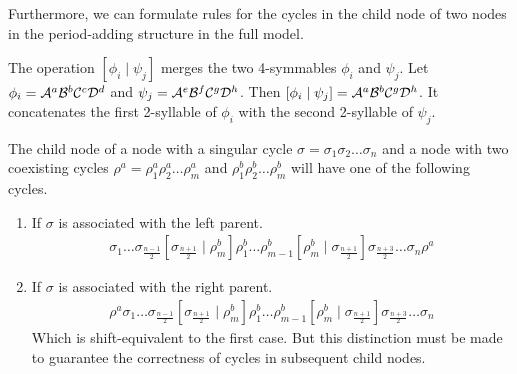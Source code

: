 Furthermore, we can formulate rules for the cycles in the child node of two nodes in the period-adding structure in the full model.

\begin{definition}
    The operation $\left[\phi_i \mid \psi_j\right]$ merges the two 4-symmables $\phi_i$ and $\psi_j$.
    Let $\phi_i = \mathcal{A}^a\mathcal{B}^b\mathcal{C}^c\mathcal{D}^d$ and $\psi_j = \mathcal{A}^e\mathcal{B}^f\mathcal{C}^g\mathcal{D}^h$.
    Then $\left[\phi_i \mid \psi_j\right] = \mathcal{A}^a\mathcal{B}^b\mathcal{C}^g\mathcal{D}^h$.
    It concatenates the first 2-syllable of $\phi_i$ with the second 2-syllable of $\psi_j$.
\end{definition}

\begin{theorem}
    The child node of a node with a singular cycle $\sigma = \sigma_1\sigma_2 \dots \sigma_n$ and a node with two coexisting cycles $\rho^a = \rho^a_1\rho^a_2 \dots \rho^a_m$ and $\rho^b_1\rho^b_2 \dots \rho^b_m$ will have one of the following cycles.
    \begin{enumerate}
        \item If $\sigma$ is associated with the left parent.
              \begin{align*}
                  \sigma_1 \dots \sigma_{\frac{n-1}{2}} \left[\sigma_{\frac{n+1}{2}} \mid \rho^b_m\right]
                  \rho^b_1 \dots \rho^b_{m-1} \left[\rho^b_m \mid \sigma_{\frac{n+1}{2}}\right]
                  \sigma_{\frac{n+3}{2}} \dots \sigma_n \rho^a
              \end{align*}
        \item If $\sigma$ is associated with the right parent.
              \begin{align*}
                  \rho^a \sigma_1 \dots \sigma_{\frac{n-1}{2}} \left[\sigma_{\frac{n+1}{2}} \mid \rho^b_m\right]
                  \rho^b_1 \dots \rho^b_{m-1} \left[\rho^b_m \mid \sigma_{\frac{n+1}{2}}\right]
                  \sigma_{\frac{n+3}{2}} \dots \sigma_n
              \end{align*}
              Which is shift-equivalent to the first case.
              But this distinction must be made to guarantee the correctness of cycles in subsequent child nodes.
    \end{enumerate}
\end{theorem}


